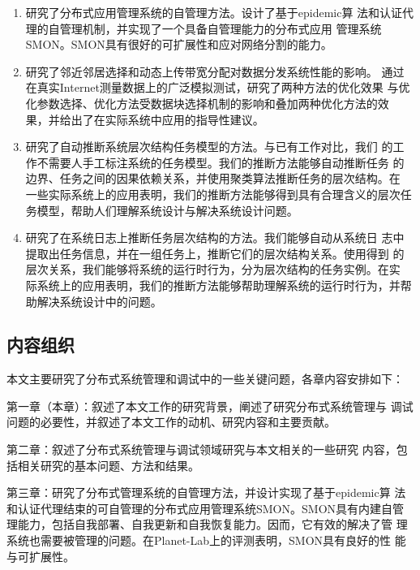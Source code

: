\begin{enumerate}

  \item 研究了分布式应用管理系统的自管理方法。设计了基于epidemic算
  法和认证代理的自管理机制，并实现了一个具备自管理能力的分布式应用
  管理系统SMON。SMON具有很好的可扩展性和应对网络分割的能力。

  \item 研究了邻近邻居选择和动态上传带宽分配对数据分发系统性能的影响。
  通过在真实Internet测量数据上的广泛模拟测试，研究了两种方法的优化效果
  与优化参数选择、优化方法受数据块选择机制的影响和叠加两种优化方法的效
  果，并给出了在实际系统中应用的指导性建议。

  \item 研究了自动推断系统层次结构任务模型的方法。与已有工作对比，我们
  的工作不需要人手工标注系统的任务模型。我们的推断方法能够自动推断任务
  的边界、任务之间的因果依赖关系，并使用聚类算法推断任务的层次结构。在
  一些实际系统上的应用表明，我们的推断方法能够得到具有合理含义的层次任
  务模型，帮助人们理解系统设计与解决系统设计问题。

  \item 研究了在系统日志上推断任务层次结构的方法。我们能够自动从系统日
  志中提取出任务信息，并在一组任务上，推断它们的层次结构关系。使用得到
  的层次关系，我们能够将系统的运行时行为，分为层次结构的任务实例。在实
  际系统上的应用表明，我们的推断方法能够帮助理解系统的运行时行为，并帮
  助解决系统设计中的问题。

\end{enumerate}

\subsection{内容组织}

本文主要研究了分布式系统管理和调试中的一些关键问题，各章内容安排如下：


  第一章（本章）：叙述了本文工作的研究背景，阐述了研究分布式系统管理与
  调试问题的必要性，并叙述了本文工作的动机、研究内容和主要贡献。

  第二章：叙述了分布式系统管理与调试领域研究与本文相关的一些研究
  内容，包括相关研究的基本问题、方法和结果。

  第三章：研究了分布式管理系统的自管理方法，并设计实现了基于epidemic算
  法和认证代理结束的可自管理的分布式应用管理系统SMON。SMON具有内建自管
  理能力，包括自我部署、自我更新和自我恢复能力。因而，它有效的解决了管
  理系统也需要被管理的问题。在Planet-Lab上的评测表明，SMON具有良好的性
  能与可扩展性。

